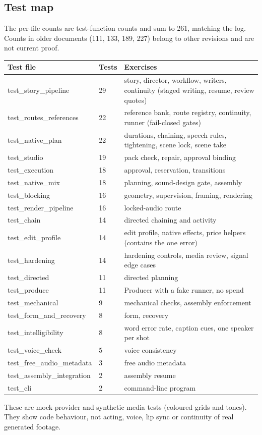 \documentclass[11pt,a4paper]{article}
\begin{document}
\subsection{Test map}
The per-file counts are test-function counts and sum to 261, matching the log. Counts in older documents (111, 133, 189, 227) belong to other revisions and are not current proof.
\begin{longtable}{@{}P{5.2cm}P{1.2cm}P{9.1cm}@{}}
\toprule \textbf{Test file} & \textbf{Tests} & \textbf{Exercises}\\ \midrule\endhead
test\_story\_pipeline & 29 & story, director, workflow, writers, continuity (staged writing, resume, review quotes)\\
test\_routes\_references & 22 & reference bank, route registry, continuity, runner (fail-closed gates)\\
test\_native\_plan & 22 & durations, chaining, speech rules, tightening, scene lock, scene take\\
test\_studio & 19 & pack check, repair, approval binding\\
test\_execution & 18 & approval, reservation, transitions\\
test\_native\_mix & 18 & planning, sound-design gate, assembly\\
test\_blocking & 16 & geometry, supervision, framing, rendering\\
test\_render\_pipeline & 16 & locked-audio route\\
test\_chain & 14 & directed chaining and activity\\
test\_edit\_profile & 14 & edit profile, native effects, price helpers (contains the one error)\\
test\_hardening & 14 & hardening controls, media review, signal edge cases\\
test\_directed & 11 & directed planning\\
test\_produce & 11 & Producer with a fake runner, no spend\\
test\_mechanical & 9 & mechanical checks, assembly enforcement\\
test\_form\_and\_recovery & 8 & form, recovery\\
test\_intelligibility & 8 & word error rate, caption cues, one speaker per shot\\
test\_voice\_check & 5 & voice consistency\\
test\_free\_audio\_metadata & 3 & free audio metadata\\
test\_assembly\_integration & 2 & assembly resume\\
test\_cli & 2 & command-line program\\
\bottomrule
\end{longtable}
These are mock-provider and synthetic-media tests (coloured grids and tones). They show code behaviour, not acting, voice, lip sync or continuity of real generated footage.
\end{document}
